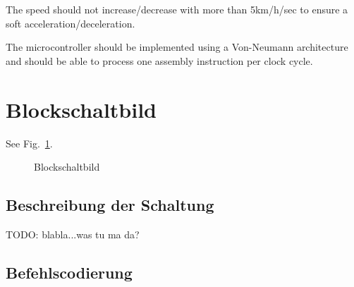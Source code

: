 \documentclass[a4paper,10pt]{scrartcl}
\begin{document}
The speed should not increase/decrease with more than 5km/h/sec to ensure a soft acceleration/deceleration. 

The microcontroller should be implemented using a Von-Neumann architecture and should be able to process one assembly instruction per clock cycle. 


\section{Blockschaltbild}
\label{sec:block}

See Fig.\ \ref{fig:block}.


\begin{figure}[ht]
	\centering
\noindent{}
	\caption{Blockschaltbild}
	\label{fig:block}
\end{figure}



\subsection{Beschreibung der Schaltung}
\label{sec:schaltung}

TODO: blabla...was tu ma da?


\subsection{Befehlscodierung}
\label{sec:bef_cod}
\end{document}
